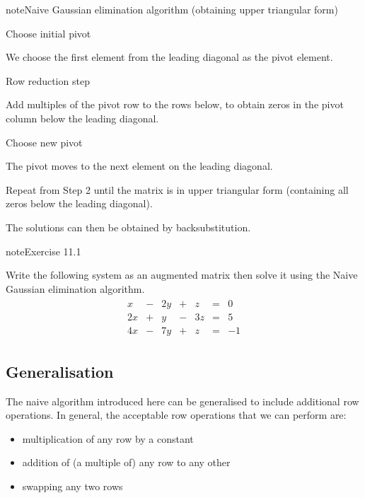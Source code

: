 \documentclass[letterpaper,10pt,english]{jupyterBook}
\begin{document}
\begin{sphinxadmonition}{note}{Naive Gaussian elimination algorithm (obtaining upper triangular form)}

\sphinxAtStartPar
{} Choose initial pivot

\sphinxAtStartPar
We choose the first element from the leading diagonal as the pivot element.

\sphinxAtStartPar
{} Row reduction step

\sphinxAtStartPar
Add multiples of the pivot row to the rows below, to obtain zeros in the pivot column below the leading diagonal.

\sphinxAtStartPar
{} Choose new pivot

\sphinxAtStartPar
The pivot moves to the next element on the leading diagonal.

\sphinxAtStartPar
{}
Repeat from Step 2 until the matrix is in upper triangular form (containing all zeros below the leading diagonal).

\sphinxAtStartPar
The solutions can then be obtained by back\sphinxhyphen{}substitution.
\end{sphinxadmonition}
 \label{exercise:q_elimination}

\begin{sphinxadmonition}{note}{Exercise 11.1}



\sphinxAtStartPar
Write the following system as an augmented matrix then solve it using the Naive Gaussian elimination algorithm.
\begin{equation*}
\begin{split}
\begin{alignat*}{4}
 x & {}-{} &  2y & {}+{} & z & {}={} &  0  \\
2x & {}+{} &  y & {}-{} & 3z & {}={} &  5  \\
4x & {}-{} &  7y & {}+{} & z & {}={} & -1
\end{alignat*}
\end{split}
\end{equation*}\end{sphinxadmonition}


\subsection{Generalisation}
\label{\detokenize{LinearAlgebra/linear_systems_matrices/echelon_form:generalisation}}
\sphinxAtStartPar
The naive algorithm introduced here can be generalised to include additional row operations. In general, the acceptable row operations that we can perform are:
\begin{itemize}
\item {} 
\sphinxAtStartPar
multiplication of any row by a constant

\item {} 
\sphinxAtStartPar
addition of (a multiple of) any row to any other

\item {} 
\sphinxAtStartPar
swapping any two rows

\end{itemize}
\end{document}
